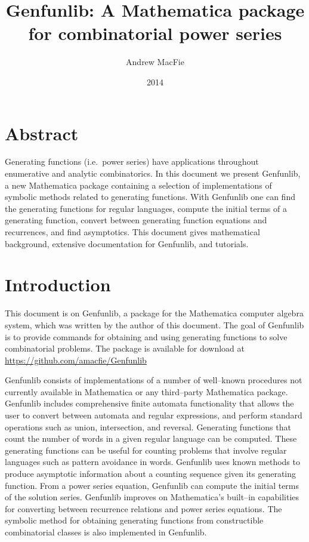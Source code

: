 \documentclass{article}
\theoremstyle{plain}
\begin{document}
\title{Genfunlib: A Mathematica package for combinatorial power series}
\author{Andrew MacFie}
\date{2014}
\maketitle


\section*{Abstract}
Generating functions (i.e.\ power series) have applications throughout
enumerative and analytic combinatorics.
In this document we present Genfunlib, a new Mathematica package containing a
selection of implementations of symbolic methods related to generating
functions.
With Genfunlib one can find the generating functions for regular languages,
compute the initial terms of a generating function, convert between
generating function equations and recurrences, and find asymptotics.
This document gives mathematical background, extensive documentation for
Genfunlib, and tutorials.


\tableofcontents





\section{Introduction}

\noindent
This document is on Genfunlib, a package for the Mathematica computer algebra
system, which was written by the author of this document.
The goal of Genfunlib is to provide commands for obtaining and using generating
functions to solve combinatorial problems.
The package is available for download at\\
\url{https://github.com/amacfie/Genfunlib}

Genfunlib consists of implementations of a number of well--known procedures not
currently available in Mathematica or any third--party Mathematica package.
Genfunlib includes comprehensive finite automata functionality that allows
the user to convert between automata and regular expressions, and perform
standard operations such as union, intersection, and reversal.
Generating functions that count the number of words in a given regular language
can be computed.
These generating functions can be useful for counting problems that involve
regular languages such as pattern avoidance in words.
Genfunlib uses known methods to produce asymptotic information about a counting
sequence given its generating function.
From a power series equation, Genfunlib can compute the initial terms of the
solution series.
Genfunlib improves on Mathematica's built--in capabilities for converting
between recurrence relations and power series equations.
The symbolic method for obtaining generating functions from constructible
combinatorial classes is also implemented in Genfunlib.
\end{document}

